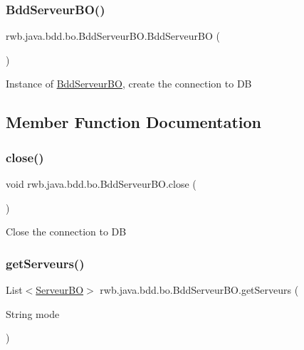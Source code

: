 \subsubsection{\texorpdfstring{Bdd\+Serveur\+B\+O()}{BddServeurBO()}}
{\footnotesize\ttfamily rwb.\+java.\+bdd.\+bo.\+Bdd\+Serveur\+B\+O.\+Bdd\+Serveur\+BO (\begin{DoxyParamCaption}{ }\end{DoxyParamCaption})}

Instance of \hyperlink{classrwb_1_1java_1_1bdd_1_1bo_1_1_bdd_serveur_b_o}{Bdd\+Serveur\+BO}, create the connection to DB 

\subsection{Member Function Documentation}
\mbox{\label{classrwb_1_1java_1_1bdd_1_1bo_1_1_bdd_serveur_b_o_a15a008ef1314b8bc6190c2b0cc24223f}} 
\subsubsection{\texorpdfstring{close()}{close()}}
{\footnotesize\ttfamily void rwb.\+java.\+bdd.\+bo.\+Bdd\+Serveur\+B\+O.\+close (\begin{DoxyParamCaption}{ }\end{DoxyParamCaption})}

Close the connection to DB \mbox{\label{classrwb_1_1java_1_1bdd_1_1bo_1_1_bdd_serveur_b_o_aaa2465c7a6a802e7c6402c08cba64ebf}} 
\subsubsection{\texorpdfstring{get\+Serveurs()}{getServeurs()}}
{\footnotesize\ttfamily List$<$\hyperlink{classrwb_1_1java_1_1server_1_1bo_1_1_serveur_b_o}{Serveur\+BO}$>$ rwb.\+java.\+bdd.\+bo.\+Bdd\+Serveur\+B\+O.\+get\+Serveurs (\begin{DoxyParamCaption}\item[{String}]{mode }\end{DoxyParamCaption})}

